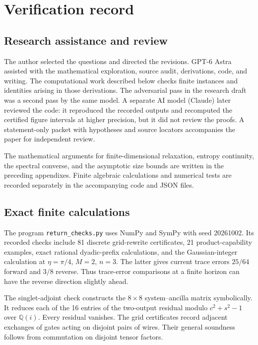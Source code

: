 \section{Verification record}\label{app:review}

\subsection{Research assistance and review}

The author selected the questions and directed the revisions. GPT-6 Astra assisted with the mathematical exploration, source audit, derivations, code, and writing. The computational work described below checks finite instances and identities arising in those derivations. The adversarial pass in the research draft was a second pass by the same model. A separate AI model (Claude) later reviewed the code: it reproduced the recorded outputs and recomputed the certified figure intervals at higher precision, but it did not review the proofs. A statement-only packet with hypotheses and source locators accompanies the paper for independent review.

The mathematical arguments for finite-dimensional relaxation, entropy continuity, the spectral converse, and the asymptotic size bounds are written in the preceding appendixes. Finite algebraic calculations and numerical tests are recorded separately in the accompanying code and JSON files.

\subsection{Exact finite calculations}

The program \texttt{return\_checks.py} uses NumPy and SymPy with seed 20261002. Its recorded checks include 81 discrete grid-rewrite certificates, 21 product-capability examples, exact rational dyadic-prefix calculations, and the Gaussian-integer calculation at $\eta=\pi/4$, $M=2$, $n=3$. The latter gives current trace errors $25/64$ forward and $3/8$ reverse. Thus trace-error comparisons at a finite horizon can have the reverse direction slightly ahead.

The singlet-adjoint check constructs the $8\times8$ system--ancilla matrix symbolically. It reduces each of the 16 entries of the two-output residual modulo $c^2+s^2-1$ over $\mathbb Q(i)$. Every residual vanishes. The grid certificates record adjacent exchanges of gates acting on disjoint pairs of wires. Their general soundness follows from commutation on disjoint tensor factors.

